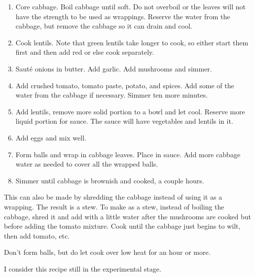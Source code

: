 \begin{recipe}
  \begin{enumerate}

  \item Core cabbage.  Boil cabbage until soft.  Do not overboil or
    the leaves will not have the strength to be used as wrappings.
    Reserve the water from the cabbage, but remove the cabbage so it
    can drain and cool.

  \item Cook lentils.  Note that green lentils take longer to cook, so
    either start them first and then add red or else cook separately.

  \item Saut\'e onions in butter.  Add garlic.  Add mushrooms and
    simmer.

  \item Add crushed tomato, tomato paste, potato, and spices.  Add some of the
    water from the cabbage if necessary.  Simmer ten more minutes.

  \item Add lentils, remove more solid portion to a bowl and let
    cool.  Reserve more liquid portion for sauce.  The sauce will have
    vegetables and lentils in it.

  \item Add eggs and mix well.

  \item Form balls and wrap in cabbage leaves.  Place in sauce.
    Add more cabbage water as needed to cover all the wrapped balls.

  \item Simmer until cabbage is brownish and cooked, a couple hours.

  \end{enumerate}
\end{recipe}



This can also be made by shredding the cabbage instead of using it as
a wrapping.  The result is a stew.  To make as a stew, instead of
boiling the cabbage, shred it and add with a little water after the
mushrooms are cooked but before adding the tomato mixture.  Cook until
the cabbage just begins to wilt, then add tomato, etc.

Don't form balls, but do let cook over low heat for an hour or more.


\bigskip

I consider this recipe still in the experimental stage.

